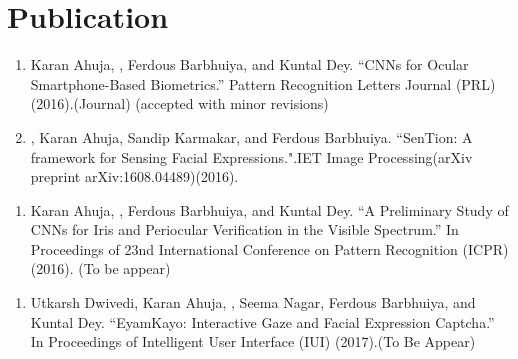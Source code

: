 \section{Publication}

\begin{enumerate}
	\item Karan Ahuja, , Ferdous Barbhuiya, and Kuntal Dey. “CNNs for Ocular Smartphone-Based Biometrics.”  Pattern Recognition Letters Journal (PRL) (2016).(Journal) (accepted with minor revisions)
	\item {}, Karan Ahuja, Sandip Karmakar, and Ferdous Barbhuiya. “SenTion: A framework for Sensing Facial Expressions.".IET Image Processing(arXiv preprint arXiv:1608.04489)(2016).
\end{enumerate}
\sectionsep

\begin{enumerate}
    \item Karan Ahuja, , Ferdous Barbhuiya, and Kuntal Dey. “A Preliminary Study of CNNs for Iris and Periocular Verification in the Visible Spectrum.”  In Proceedings of 23nd International Conference on Pattern Recognition (ICPR) (2016). (To be appear)
\end{enumerate}

\begin{enumerate} 
	\item Utkarsh Dwivedi, Karan Ahuja, , Seema Nagar, Ferdous Barbhuiya, and Kuntal Dey. “EyamKayo: Interactive Gaze and Facial Expression Captcha.”  In Proceedings of Intelligent User Interface (IUI) (2017).(To Be Appear)
\end{enumerate}

